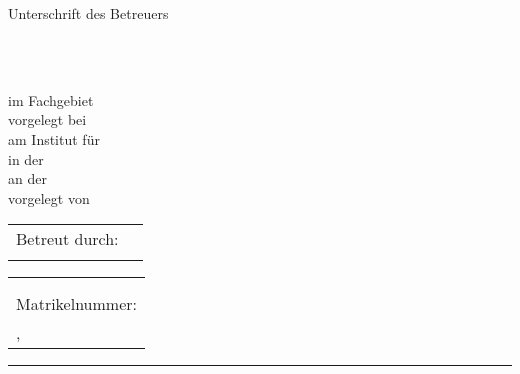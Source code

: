 	\begin{titlepage}
		
		\begin{flushleft}
			Unterschrift des Betreuers
		\end{flushleft}
		
		\noindent
		\textbf{\huge \trtitle}\par
		\epigraph{\trquote}%
		{\textit{\trquoteorigin}\\ \textsc{\trquoteman}}
		\null\vfill
		\vspace*{1cm}
		\noindent
		\hfill
		
		
		\begin{center}
			\textbf{\trtype} \\
			im Fachgebiet \trfachgebiet \\
			vorgelegt bei \trprof \\
			am Institut für \trinstitut \\
			in der \trfakultaet \\
			an der \truni \\[0.5cm]
			vorgelegt von \\
			\textbf{\trauthor}
			
			
			\begin{center}
				\begin{tabular}{ll}
					Betreut durch:& \trbetreuer  \\
					& \trbetreuerberni \\
				\end{tabular}
			\end{center}
		\end{center}
		
		\begin{flushright}
		\begin{minipage}{0.35\linewidth}
			\begin{flushright}
				\begin{tabular}{l}
					\trauthor \\
					\trauthoradress \\
					Matrikelnummer:  \trmatrikelnummer \\
					\trort, \trdate
				\end{tabular}
			\end{flushright}
		\end{minipage}
		\begin{minipage}{0.02\linewidth}
			\rule{1pt}{70pt}
		\end{minipage}
		\end{flushright}
	

\end{titlepage}
